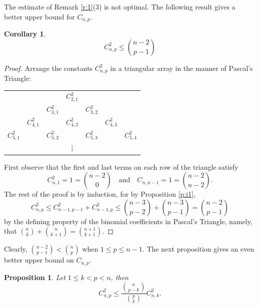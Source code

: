 \documentclass[12pt]{amsart}
\newtheorem{corollary}[theorem]{Corollary}
\newtheorem{proposition}[theorem]{Proposition}
\theoremstyle{definition}
\theoremstyle{remark}
\numberwithin{equation}{section}
\begin{document}
The estimate of Remark \ref{r:1}(3) is not optimal. The following
result gives a better upper bound for $C_{n,p}$.

\begin{corollary}\label{c:i1}%
\begin{equation*} C_{n,p}^2 \leq \binom{n-2}{p-1} \end{equation*}
\end{corollary}
\begin{proof}
Arrange the constants $C_{n,p}^2$  in a triangular array in the manner of Pascal's Triangle:

\begin{center}
\begin{tabular}{ccccccc}
&&&$C_{2,1}^2$&&&\\
&&$C_{3,1}^2$&&$C_{3,2}^2$&&\\
&$C_{4,1}^2$&&$C_{4,2}^2$&&$C_{4,3}^2$&\\
$C_{5,1}^2$&&$C_{5,2}^2$&&$C_{5,3}^2$&&$C_{5,4}^2$\\
&&&\vdots\\
\end{tabular}
\end{center}
First observe that the first and last terms on each row of the triangle satisfy
\begin{equation*}
 C_{n,1}^2 =1 = \binom{n-2}{0}\quad\mathrm{and}\quad C_{n,n-1} =1= \binom{n-2}{n-2}.
 \end{equation*}
The rest of the proof is by induction,  for by Proposition \ref{p:i1},
\begin{equation*}
 C_{n,p}^2 \leq C_{n-1,p-1}^2 +C_{n-1,p}^2 \leq \binom{n-3}{p-2} +\binom{n-3}{p-1} = \binom{n-2}{p-1} 
 \end{equation*}
by the defining property of the binomial coefficients in Pascal's Triangle, namely, that $\binom{n}{k}+\binom{n}{k+1}=\binom{n+1}{k+1}$.
\end{proof}

Clearly, $\binom{n-2}{p-1} < \binom{n}{p}$ when $ 1 \leq p \leq n-1$. The next proposition gives an even better upper bound on $C_{n,p}$.

  
\begin{proposition}\label{p:i2}%
Let $1\leq k<p<n$, then
\begin{equation*}
C_{n,p}^2 \leq \frac {\binom{n}{p-k}}{\binom{p}{k}} C_{n,k}^2.
\end{equation*}
\end{proposition}
\end{document}

